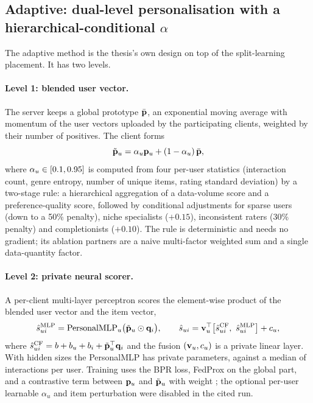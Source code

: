 \subsection{Adaptive: dual-level personalisation with a hierarchical-conditional \texorpdfstring{$\alpha$}{alpha}}
\label{sec:method-adaptive}

The adaptive method is the thesis's own design on top of the split-learning placement. It has
two levels.

\paragraph{Level 1: blended user vector.} The server keeps a global prototype
$\bar{\mathbf{p}}$, an exponential moving average with momentum \PrototypeMomentum{} of the
user vectors uploaded by the participating clients, weighted by their number of positives. The
client forms
\begin{equation}
  \tilde{\mathbf{p}}_u = \alpha_u \mathbf{p}_u + (1-\alpha_u)\, \bar{\mathbf{p}},
  \label{eq:blend}
\end{equation}
where $\alpha_u \in [0.1, 0.95]$ is computed from four per-user statistics (interaction count,
genre entropy, number of unique items, rating standard deviation) by a two-stage rule: a
hierarchical aggregation of a data-volume score and a preference-quality score, followed by
conditional adjustments for sparse users (down to a 50\% penalty), niche specialists ($+0.15$),
inconsistent raters (30\% penalty) and completionists ($+0.10$). The rule is deterministic and
needs no gradient; its ablation partners are a naive multi-factor weighted sum and a single
data-quantity factor.

\paragraph{Level 2: private neural scorer.} A per-client multi-layer perceptron scores the
element-wise product of the blended user vector and the item vector,
\begin{equation}
  \hat{s}^{\text{MLP}}_{ui} = \text{PersonalMLP}_u\big(\tilde{\vect{p}}_u \odot \qi\big),
  \qquad
  \hat{s}_{ui} = \vect{v}_u^\top \big[\hat{s}^{\text{CF}}_{ui},\ \hat{s}^{\text{MLP}}_{ui}\big] + c_u,
  \label{eq:dual}
\end{equation}
where $\hat{s}^{\text{CF}}_{ui} = b + b_u + b_i + \tilde{\mathbf{p}}_u^\top\mathbf{q}_i$ and the fusion
$(\mathbf{v}_u, c_u)$ is a private linear layer. With hidden sizes \MlpHidden{} the PersonalMLP
has \ParamsPersonalMlp{} private parameters, against a median of \DsMedianRatings{}
interactions per user. Training uses the BPR loss, FedProx on the global part, and a contrastive
term between $\mathbf{p}_u$ and $\tilde{\mathbf{p}}_u$ with weight \ContrastiveLambda; the optional
per-user learnable $\alpha_u$ and item perturbation were disabled in the cited run.


